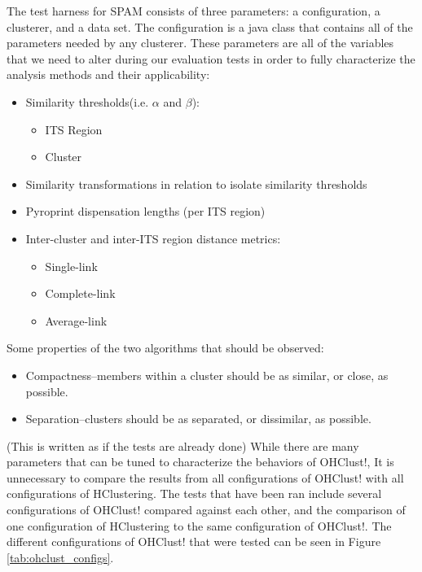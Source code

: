 \documentclass[12pt]{ucthesis}
\begin{document}
      The test harness for SPAM consists of three parameters: a configuration,
      a clusterer, and a data set. The configuration is a java class that
      contains all of the parameters needed by any clusterer. These
      parameters are all of the variables that we need to alter during our
      evaluation tests in order to fully characterize the analysis methods and
      their applicability:
      \begin{itemize}
         \item Similarity thresholds(i.e. $\alpha$ and $\beta$):
               \begin{itemize}
                  \item ITS Region
                  \item Cluster
               \end{itemize}
         \item Similarity transformations in relation to isolate similarity
               thresholds
         \item Pyroprint dispensation lengths (per ITS region)
         \item Inter-cluster and inter-ITS region distance metrics:
               \begin{itemize}
                  \item Single-link
                  \item Complete-link
                  \item Average-link
               \end{itemize}
      \end{itemize}
      Some properties of the two algorithms that should be observed:
      \begin{itemize}
         \item Compactness--members within a cluster should be as similar, or
               close, as possible.
         \item Separation--clusters should be as separated, or dissimilar, as
               possible.
      \end{itemize}

      (This is written as if the tests are already done) While there are many
      parameters that can be tuned to characterize the behaviors of OHClust!,
      It is unnecessary to compare the results from all configurations of
      OHClust! with all configurations of HClustering. The tests that have been
      ran include several configurations of OHClust! compared against each other, and the
      comparison of one configuration of HClustering to the same configuration
      of OHClust!. The different configurations of OHClust! that were tested
      can be seen in Figure \ref{tab:ohclust_configs}.
\end{document}
